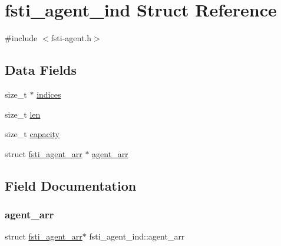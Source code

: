 \hypertarget{structfsti__agent__ind}{}\section{fsti\+\_\+agent\+\_\+ind Struct Reference}
\label{structfsti__agent__ind}


{\ttfamily \#include $<$fsti-\/agent.\+h$>$}

\subsection*{Data Fields}
\begin{DoxyCompactItemize}
\item 
size\+\_\+t $\ast$ \mbox{\hyperlink{structfsti__agent__ind_a2892aba8fbb99f0ceb363c434c861e4f}{indices}}
\item 
size\+\_\+t \mbox{\hyperlink{structfsti__agent__ind_aa1deb5291b58997006ed73cdfdacb946}{len}}
\item 
size\+\_\+t \mbox{\hyperlink{structfsti__agent__ind_a04dc165ff5ad97307c8881aa2e230455}{capacity}}
\item 
struct \mbox{\hyperlink{structfsti__agent__arr}{fsti\+\_\+agent\+\_\+arr}} $\ast$ \mbox{\hyperlink{structfsti__agent__ind_a6fb589d3c9ed085bff1be5f3e90f6ccb}{agent\+\_\+arr}}
\end{DoxyCompactItemize}


\subsection{Field Documentation}
\mbox{\label{structfsti__agent__ind_a6fb589d3c9ed085bff1be5f3e90f6ccb}} 
\subsubsection{\texorpdfstring{agent\+\_\+arr}{agent\_arr}}
{\footnotesize\ttfamily struct \mbox{\hyperlink{structfsti__agent__arr}{fsti\+\_\+agent\+\_\+arr}}$\ast$ fsti\+\_\+agent\+\_\+ind\+::agent\+\_\+arr}

\mbox{\label{structfsti__agent__ind_a04dc165ff5ad97307c8881aa2e230455}} 
